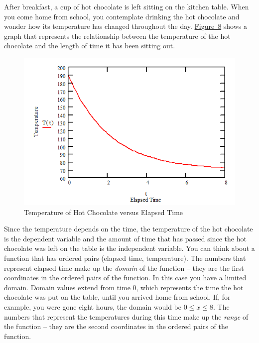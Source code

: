 \documentclass[10pt,]{book}
\theoremstyle{ptxdefinitionnotitle}
\theoremstyle{ptxdefinitiontitle}
\numberwithin{equation}{section}
\begin{document}
\begin{example}\label{example-2}
\hypertarget{p-24}{}%
After breakfast, a cup of hot chocolate is left sitting on the kitchen table.  When you come home from school, you contemplate drinking the hot chocolate and wonder how its temperature has changed throughout the day.  \hyperref[chapter02-section01-example02-graph]{Figure~8} shows a graph that represents the relationship between the temperature of the hot chocolate and the length of time it has been sitting out.%
\begin{figure}
\centering
\includegraphics[width=1\linewidth]{./src/images/chapter02/chapter02section01-example02-graph.png}
\caption{Temperature of Hot Chocolate versus Elapsed Time\label{chapter02-section01-example02-graph}}
\end{figure}
\hypertarget{p-25}{}%
Since the temperature depends on the time, the temperature of the hot chocolate is the dependent variable and the amount of time that has passed since the hot chocolate was left on the table is the independent variable.  You can think about a function that has ordered pairs (elapsed time, temperature). The numbers that represent elapsed time make up the \emph{domain} of the function -- they are the first coordinates in the ordered pairs of the function.  In this case you have a limited domain.  Domain values extend from time 0, which represents the time the hot chocolate was put on the table, until you arrived home from school.  If, for example, you were gone eight hours, the domain would be \(0 \leq x \leq 8\).  The numbers that represent the temperatures during this time make up the \emph{range} of the function -- they are the second coordinates in the ordered pairs of the function.%

\end{example}
\end{document}
